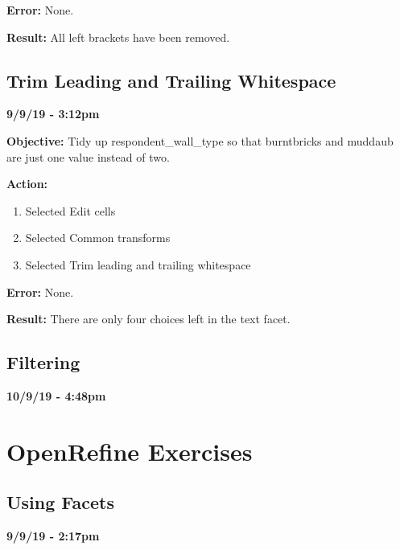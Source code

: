 \documentclass{article}
\begin{document}
\textbf{Error:} None.

\textbf{Result:} All left brackets have been removed.

\subsection{Trim Leading and Trailing Whitespace}

\textbf{9/9/19 - 3:12pm}

\textbf{Objective:} Tidy up respondent\_wall\_type so that burntbricks and muddaub are just one value instead of two.

\textbf{Action:}

\begin{enumerate}
    \item Selected Edit cells
    \item Selected Common transforms
    \item Selected Trim leading and trailing whitespace
\end{enumerate}

\textbf{Error:} None.

\textbf{Result:} There are only four choices left in the text facet.

\subsection{Filtering}

\textbf{10/9/19 - 4:48pm}



\newpage
\section{OpenRefine Exercises}

\subsection{Using Facets}

\textbf{9/9/19 - 2:17pm}
\end{document}
